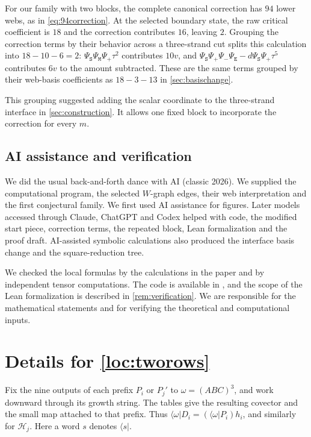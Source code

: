 \documentclass[a4paper,11pt]{amsart}
\newcommand{\wordstart}{\mathtt{S}}
\newcommand{\wordmiddle}{\mathtt{M}}
\newcommand{\wordend}{\mathtt{E}}
\newcommand{\startmap}{{\Psi}_{{\wordstart}}}
\newcommand{\middlemap}{{\Psi}_{{\wordmiddle}}}
\newcommand{\finishmap}{{\Psi}_{{\wordend}}}
\newcommand{\createmap}{{\Psi}_+}
\newcommand{\removemap}{{\Psi}_-}
\newcommand{\tpar}{v}
\numberwithin{equation}{subsection}
\theoremstyle{plain}
\theoremstyle{definition}
\theoremstyle{remark}
\begin{document}
For our family with two blocks, the complete canonical
correction has $94$ lower webs, as in \autoref{eq:94correction}.
At the selected boundary state, the raw critical coefficient is $18$
and the correction contributes $16$, leaving $2$. Grouping the
correction terms by their behavior across a three-strand cut splits
this calculation into $18-10-6=2$: $\startmap\middlemap\createmap\tau^2$ contributes
$10\tpar$, and $\startmap\createmap\removemap\finishmap-d\startmap\createmap\tau^5$ contributes $6\tpar$ to the amount
subtracted. These are the same terms grouped by their web-basis
coefficients as $18-3-13$ in \autoref{sec:basischange}.

This grouping suggested adding the scalar coordinate to the
three-strand interface in \autoref{sec:construction}. It allows one
fixed block to incorporate the correction for every $m$.

\subsection{AI assistance and verification}

We did the usual back-and-forth dance with AI (classic 2026).
We supplied the computational program, the selected $W$-graph
edges, their web interpretation and the first conjectural family.
We first used AI assistance for figures. Later models accessed
through Claude, ChatGPT and Codex helped with code, the modified
start piece, correction terms, the repeated block, Lean formalization and the proof draft.
AI-assisted symbolic calculations also produced the interface basis
change and the square-reduction tree.

We checked the local formulas by the calculations in the paper and
by independent tensor computations. The code is available in \cite{GoLaTuVa-mu-code}, and the scope of
the Lean formalization is described in \autoref{rem:verification}.
We are responsible for the mathematical statements and for verifying
the theoretical and computational inputs.

\appendix

\section{Details for \autoref{loc:tworows}}\label{loc:covectorappendix}

\addtocounter{subsection}{1}

Fix the nine outputs of each prefix $P_i$ or $P_j'$ to
$\omega=(ABC)^3$, and work downward through its growth string.
The tables give the resulting covector and the small map attached
to that prefix. Thus
$\langle\omega|D_i=(\langle\omega|P_i)h_i$, and similarly for $\mathcal H_j$.
Here a word $s$ denotes $\langle s|$.
\end{document}
